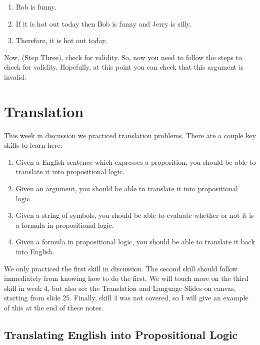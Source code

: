 \documentclass[
]{book}
\providecommand{\tightlist}{%
  \setlength{\itemsep}{0pt}\setlength{\parskip}{0pt}}
\begin{document}
\begin{enumerate}
\def\labelenumi{\arabic{enumi}.}
\tightlist
\item
  Bob is funny.
\item
  If it is hot out today then Bob is funny and Jerry is silly.
\item
  Therefore, it is hot out today.
\end{enumerate}

Now, (Step Three), check for validity. So, now you need to follow the steps to check for validity. Hopefully, at this point you can check that this argument is invalid.

\hypertarget{translation}{%
\chapter{Translation}\label{translation}}

This week in discussion we practiced translation problems. There are a couple key skills to learn here:

\begin{enumerate}
\def\labelenumi{\arabic{enumi}.}
\tightlist
\item
  Given a English sentence which expresses a proposition, you should be able to translate it into propositional logic.
\item
  Given an argument, you should be able to translate it into propositional logic.
\item
  Given a string of symbols, you should be able to evaluate whether or not it is a formula in propositional logic.
\item
  Given a formula in propositional logic, you should be able to translate it back into English.
\end{enumerate}

We only practiced the first skill in discussion. The second skill should follow immediately from knowing how to do the first. We will touch more on the third skill in week 4, but also see the Translation and Language Slides on canvas, starting from slide 25. Finally, skill 4 was not covered, so I will give an example of this at the end of these notes.

\hypertarget{translating-english-into-propositional-logic}{%
\section{Translating English into Propositional Logic}\label{translating-english-into-propositional-logic}}
\end{document}
